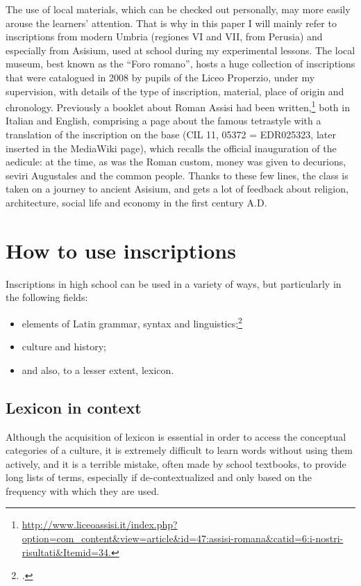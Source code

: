 \documentclass[amsthm,ebook]{saparticle}
\begin{document}
The use of local materials, which can be checked out personally, may more easily arouse the learners’ attention. That is
why in this paper I will mainly refer to inscriptions from modern Umbria (regiones VI and VII, from Perusia) and
especially from Asisium, used at school during my experimental lessons. The local museum, best known as the ``Foro
romano'', hosts a huge collection of inscriptions that were catalogued in 2008 by pupils of the Liceo Properzio, under
my supervision, with details of the type of inscription, material, place of origin and chronology. Previously a booklet
about Roman Assisi had been
written,\footnote{\url{http://www.liceoassisi.it/index.php?option=com\_content\&view=article\&id=47:assisi-romana\&catid=6:i-nostri-risultati\&Itemid=34.}}
both in Italian and English, comprising a page about the famous tetrastyle with a translation of the inscription on the
base (CIL 11, 05372 = EDR025323, later inserted in the MediaWiki page), which recalls the official inauguration of the
aedicule: at the time, as was the Roman custom, money was given to decurions, seviri Augustales and the common people.
Thanks to these few lines, the class is taken on a journey to ancient Asisium, and gets a lot of feedback about
religion, architecture, social life and economy in the first century A.D.

\section{How to use inscriptions}
\noindent Inscriptions in high school can be used in a variety of ways, but particularly in the following fields:

\begin{itemize}
\item elements of Latin grammar, syntax and linguistics;\footnote{\citet{Hartnett2012, McCarthy1992}.}
\item culture and history;
\item and also, to a lesser extent, lexicon. 
\end{itemize}



\subsection{Lexicon in context}
\noindent Although the acquisition of lexicon is essential in order to access the conceptual categories of a culture, it is
extremely difficult to learn words without using them actively, and it is a terrible mistake, often made by school
textbooks, to provide long lists of terms, especially if de-contextualized and only based on the frequency with which
they are used.
\end{document}
